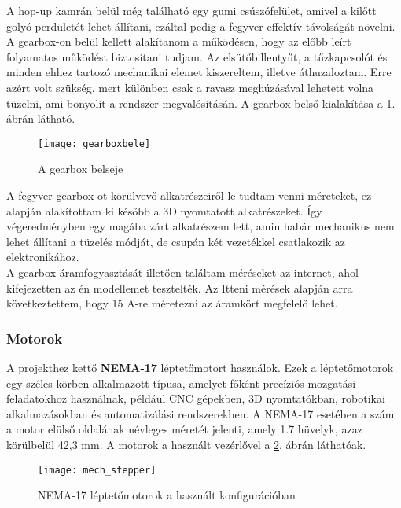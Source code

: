 A hop-up kamrán belül még található egy gumi csúszófelület, amivel a kilőtt golyó perdületét lehet állítani, ezáltal pedig a fegyver effektív távolságát növelni.\\

A gearbox-on belül kellett alakítanom a működésen, hogy az előbb leírt folyamatos működést biztosítani tudjam.  Az elsütőbillentyűt, a tűzkapcsolót és minden ehhez tartozó mechanikai elemet kiszereltem, illetve áthuzaloztam. Erre azért volt szükség, mert különben csak a ravasz meghúzásával lehetett volna tüzelni, ami bonyolít a rendszer megvalósításán. A gearbox belső kialakítása a \ref{fig:gearboxbele}. ábrán látható.

\begin{figure}[h!]
	\centering
	\texttt{[image: gearboxbele]}
	\caption{A gearbox belseje\cite{airsoft}}
	\label{fig:gearboxbele}
\end{figure}

A fegyver gearbox-ot körülvevő alkatrészeiről le tudtam venni méreteket, ez alapján alakítottam ki később a 3D nyomtatott alkatrészeket. Így végeredményben egy magába zárt alkatrészem lett, amin habár mechanikus nem lehet állítani a tüzelés módját, de csupán két vezetékkel csatlakozik az elektronikához. \\

A gearbox áramfogyasztását illetően találtam méréseket az internet, ahol kifejezetten az én modellemet tesztelték. Az Itteni mérések alapján arra következtettem, hogy 15 A-re méretezni az áramkört megfelelő lehet. \cite{airsoftteszt}

\subsubsection*{Motorok}

A projekthez kettő \textbf{NEMA-17} léptetőmotort használok\cite{nema17}. Ezek a léptetőmotorok egy széles körben alkalmazott típusa, amelyet főként precíziós mozgatási feladatokhoz használnak, például CNC gépekben, 3D nyomtatókban, robotikai alkalmazásokban és automatizálási rendszerekben. A NEMA-17 esetében a szám a motor elülső oldalának névleges méretét jelenti, amely 1.7 hüvelyk, azaz körülbelül 42,3 mm. A motorok a használt vezérlővel a \ref{fig:mech_stepper}. ábrán láthatóak.\\

\begin{figure}[h!]
	\centering
	\texttt{[image: mech\_stepper]}
	\caption{NEMA-17 léptetőmotorok a használt konfigurációban \cite{stepperhat}}
	\label{fig:mech_stepper}
\end{figure}

